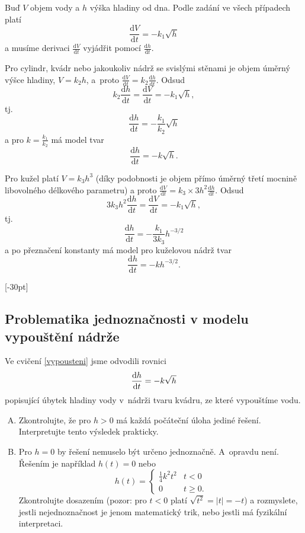 \reseni
Buď $V$ objem vody a $h$ výška hladiny od dna.
Podle zadání ve všech případech platí $$\frac {\mathrm dV}{\mathrm dt}=-k_1\sqrt h$$ a musíme derivaci $\frac {\mathrm dV}{\mathrm dt}$ vyjádřit pomocí $\frac {\mathrm dh}{\mathrm dt}$.

Pro cylindr, kvádr nebo jakoukoliv nádrž se svislými stěnami je objem úměrný výšce hladiny, $V=k_2 h$, a proto $\frac {\mathrm dV}{\mathrm dt}=k_2\frac {\mathrm dh}{\mathrm dt}$. Odsud
$$k_2\frac {\mathrm dh}{\mathrm dt}=\frac {\mathrm dV}{\mathrm dt}=-k_1\sqrt h,$$
tj.
$$\frac {\mathrm dh}{\mathrm dt}=-\frac{k_1}{k_2}\sqrt h$$
a pro $k=\frac{k_1}{k_2}$ má model tvar
$$\frac {\mathrm dh}{\mathrm dt}=-k\sqrt h.$$

Pro kužel platí $V=k_3h^3$ (díky podobnosti je objem přímo úměrný třetí mocnině libovolného délkového parametru) a proto
$\frac {\mathrm dV}{\mathrm dt}=k_3 \times 3h^2 \frac {\mathrm dh}{\mathrm dt}$.
Odsud
$$3k_3 h^2 \frac {\mathrm dh}{\mathrm dt}=\frac {\mathrm dV}{\mathrm dt}=-k_1\sqrt h,$$
tj. 
$$\frac {\mathrm dh}{\mathrm dt}=-\frac{k_1}{3k_3}h^{-3/2}$$
a po přeznačení konstanty má model pro kuželovou nádrž tvar
$$\frac {\mathrm dh}{\mathrm dt}=-kh^{-3/2}.$$


\konec

\stranka
{}[-30pt]


\subsection{Problematika jednoznačnosti v modelu vypouštění nádrže}

Ve cvičení \ref{vypousteni}  jsme odvodili rovnici
$$\frac{\mathrm{d}h}{\mathrm{d}t}=-k\sqrt h$$
popisující úbytek hladiny vody v nádrži tvaru kvádru, ze které vypouštíme vodu.
\begin{enumerate}[A)]
\item Zkontrolujte, že pro $h>0$ má každá počáteční úloha jediné řešení. Interpretujte tento výsledek prakticky.
\item Pro $h=0$ by řešení nemuselo být určeno jednoznačně. A opravdu
  není. Řešením je například $h(t)=0$ nebo $$h(t)=
  \begin{cases}
    \frac 14 k^2 t^2 & t<0\\
    0 & t\geq 0.
  \end{cases}
  $$
Zkontrolujte dosazením (pozor: pro $t<0$ platí $\sqrt {t^2}=|t|=-t$) a rozmyslete, jestli nejednoznačnost je jenom matematický trik, nebo jestli má
 fyzikální interpretaci.
\end{enumerate}

